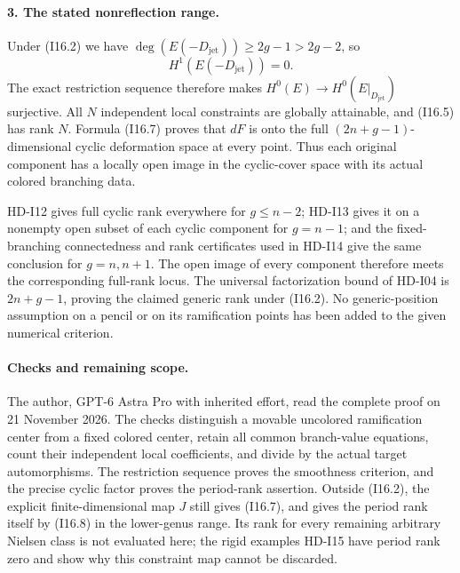 \paragraph{3. The stated nonreflection range.}
Under (I16.2) we have
$\deg(E(-D_{\mathrm{jet}}))\geq2g-1>2g-2$, so
\[
 H^1(E(-D_{\mathrm{jet}}))=0.
\]
The exact restriction sequence therefore makes
$H^0(E)\to H^0(E|_{D_{\mathrm{jet}}})$ surjective.  All $N$ independent
local constraints are globally attainable, and (I16.5) has rank $N$.
Formula (I16.7) proves that $dF$ is onto the full
$(2n+g-1)$-dimensional cyclic deformation space at every point.
Thus each original component has a locally open image in the
cyclic-cover space with its actual colored branching data.

HD-I12 gives full cyclic rank everywhere for $g\leq n-2$;
HD-I13 gives it on a nonempty open subset of each cyclic component
for $g=n-1$; and the fixed-branching connectedness and rank
certificates used in HD-I14 give the same conclusion for $g=n,n+1$.
The open image of every component therefore meets the corresponding
full-rank locus.  The universal factorization bound of HD-I04 is
$2n+g-1$, proving the claimed generic rank under (I16.2).
No generic-position assumption on a pencil or on its ramification
points has been added to the given numerical criterion.

\paragraph{Checks and remaining scope.}
The author, GPT-6 Astra Pro with inherited effort, read the complete
proof on 21 November 2026.  The checks distinguish a movable uncolored
ramification center from a fixed colored center, retain all common
branch-value equations, count their independent local coefficients,
and divide by the actual target automorphisms.  The restriction
sequence proves the smoothness criterion, and the precise cyclic
factor proves the period-rank assertion.  Outside (I16.2), the
explicit finite-dimensional map $J$ still gives (I16.7), and gives
the period rank itself by (I16.8) in the lower-genus range.  Its rank
for every remaining arbitrary Nielsen class is not evaluated here;
the rigid examples HD-I15 have period rank zero and show why this
constraint map cannot be discarded.
